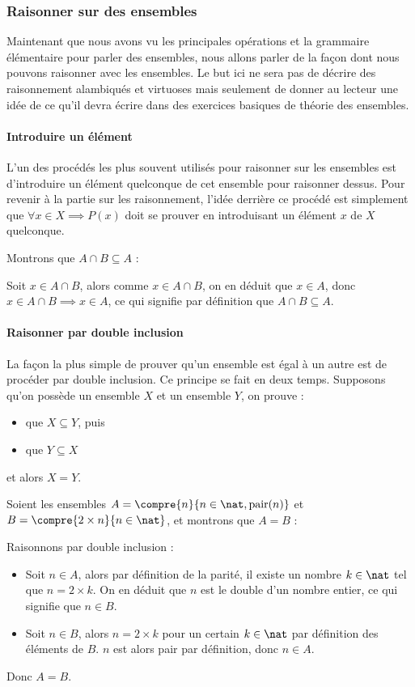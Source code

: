 \subsubsection{Raisonner sur des ensembles}

Maintenant que nous avons vu les principales opérations et la grammaire élémentaire pour parler des ensembles, nous allons parler de la façon dont nous pouvons raisonner avec les ensembles. Le but ici ne sera pas de décrire des raisonnement alambiqués et virtuoses mais seulement de donner au lecteur une idée de ce qu'il devra écrire dans des exercices basiques de théorie des ensembles.

\paragraph{Introduire un élément}
L'un des procédés les plus souvent utilisés pour raisonner sur les ensembles est d'introduire un élément quelconque de cet ensemble pour raisonner dessus. Pour revenir à la partie sur les raisonnement, l'idée derrière ce procédé est simplement que $\forall x\in X \implies P(x)$ doit se prouver en introduisant un élément $x$ de $X$ quelconque.

\begin{expl}
    Montrons que $A\cap B \subseteq A$ :
    
    Soit $x\in A\cap B$, alors comme $x\in A\cap B$, on en déduit que $x\in A$, donc $x\in A\cap B \implies x\in A$, ce qui signifie par définition que $A\cap B \subseteq A$.
\end{expl}

\paragraph{Raisonner par double inclusion}
La façon la plus simple de prouver qu'un ensemble est égal à un autre est de procéder par double inclusion. Ce principe se fait en deux temps. Supposons qu'on possède un ensemble $X$ et un ensemble $Y$, on prouve :
\begin{itemize}[label=$\bullet$]
    \item que $X\subseteq Y$, puis
    \item que $Y\subseteq X$
\end{itemize}
et alors $X=Y$.

\begin{expl}
    Soient les ensembles $A=\compre{n}{n\in\nat, \mathrm{pair}(n)}$ et $B=\compre{2\times n}{n\in \nat}$, et montrons que $A=B$ :
    
    Raisonnons par double inclusion :
    \begin{itemize}[label=$\bullet$]
        \item Soit $n\in A$, alors par définition de la parité, il existe un nombre $k\in\nat$ tel que $n=2\times k$. On en déduit que $n$ est le double d'un nombre entier, ce qui signifie que $n\in B$.
        \item Soit $n\in B$, alors $n=2\times k$ pour un certain $k\in\nat$ par définition des éléments de $B$. $n$ est alors pair par définition, donc $n\in A$.
    \end{itemize}
    Donc $A=B$.
\end{expl}


